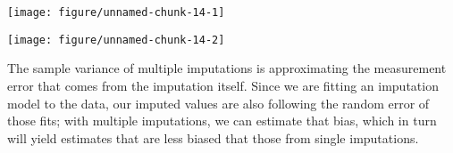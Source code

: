 \documentclass[headinclude=false]{scrartcl}\usepackage[]{graphicx}\usepackage[]{color}
\makeatletter
\def\maxwidth{ %
  \ifdim\Gin@nat@width>\linewidth
    \linewidth
  \else
    \Gin@nat@width
  \fi
}
\newenvironment{knitrout}{}{} %
\makeatother
\begin{document}
\begin{knitrout}
{\centering \texttt{[image: figure/unnamed-chunk-14-1]} 

}




{\centering \texttt{[image: figure/unnamed-chunk-14-2]} 

}



\end{knitrout}

The sample variance of multiple imputations is approximating the measurement
error that comes from the imputation itself. Since we are fitting an imputation
model to the data, our imputed values are also following the random error of
those fits; with multiple imputations, we can estimate that bias, which in turn
will yield estimates that are less biased that those from single imputations.
\end{document}
